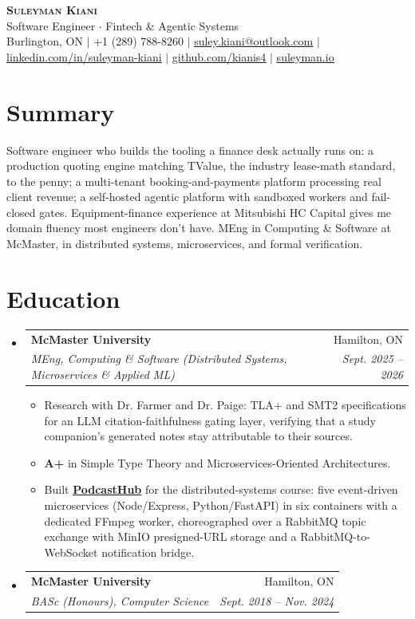 \documentclass[letterpaper,11pt]{article}
\makeatletter
\newcommand{\resumeItem}[1]{
  \item\small{
    {#1\vspace{-2pt}}
  }
}
\newcommand{\resumeSubheading}[4]{
  \vspace{-2pt}\item
    \begin{tabular*}{0.97\textwidth}[t]{l@{\extracolsep{\fill}}r}
      \textbf{#1} & #2 \\
      \textit{\small#3} & \textit{\small #4} \\
    \end{tabular*}\vspace{-7pt}
}
\newcommand{\resumeSubHeadingListStart}{\begin{itemize}[leftmargin=0.15in, label={}]}
\newcommand{\resumeSubHeadingListEnd}{\end{itemize}}
\newcommand{\resumeItemListStart}{\begin{itemize}}
\newcommand{\resumeItemListEnd}{\end{itemize}\vspace{-5pt}}
\makeatother
\begin{document}
\begin{center}
    \textbf{\Huge \scshape Suleyman Kiani} \\ \vspace{3pt}
    \small Software Engineer $\cdot$ Fintech \& Agentic Systems \\ \vspace{3pt}
    \footnotesize Burlington, ON $|$ +1 (289) 788-8260 $|$ \href{mailto:suley.kiani@outlook.com}{\underline{suley.kiani@outlook.com}} $|$ \href{https://www.linkedin.com/in/suleyman-kiani}{\underline{linkedin.com/in/suleyman-kiani}} $|$ \href{https://github.com/kianis4}{\underline{github.com/kianis4}} $|$ \href{https://suleyman.io}{\underline{suleyman.io}}
\end{center}

\section{Summary}
\vspace{2pt}
\small{Software engineer who builds the tooling a finance desk actually runs on: a production quoting engine matching TValue, the industry lease-math standard, to the penny; a multi-tenant booking-and-payments platform processing real client revenue; a self-hosted agentic platform with sandboxed workers and fail-closed gates. Equipment-finance experience at Mitsubishi HC Capital gives me domain fluency most engineers don't have. MEng in Computing \& Software at McMaster, in distributed systems, microservices, and formal verification.}
\vspace{-4pt}

\section{Education}
  \resumeSubHeadingListStart
    \resumeSubheading
      {McMaster University}{Hamilton, ON}
      {MEng, Computing \& Software (Distributed Systems, Microservices \& Applied ML)}{Sept. 2025 -- 2026}
      \resumeItemListStart
        \resumeItem{Research with Dr. Farmer and Dr. Paige: TLA+ and SMT2 specifications for an LLM citation-faithfulness gating layer, verifying that a study companion's generated notes stay attributable to their sources.}
        \resumeItem{\textbf{A+} in Simple Type Theory and Microservices-Oriented Architectures.}
        \resumeItem{Built \href{https://www.suleyman.io/architecture}{\underline{\textbf{PodcastHub}}} for the distributed-systems course: five event-driven microservices (Node/Express, Python/FastAPI) in six containers with a dedicated FFmpeg worker, choreographed over a RabbitMQ topic exchange with MinIO presigned-URL storage and a RabbitMQ-to-WebSocket notification bridge.}
      \resumeItemListEnd
    \resumeSubheading
      {McMaster University}{Hamilton, ON}
      {BASc (Honours), Computer Science}{Sept. 2018 -- Nov. 2024}
  \resumeSubHeadingListEnd
\end{document}
